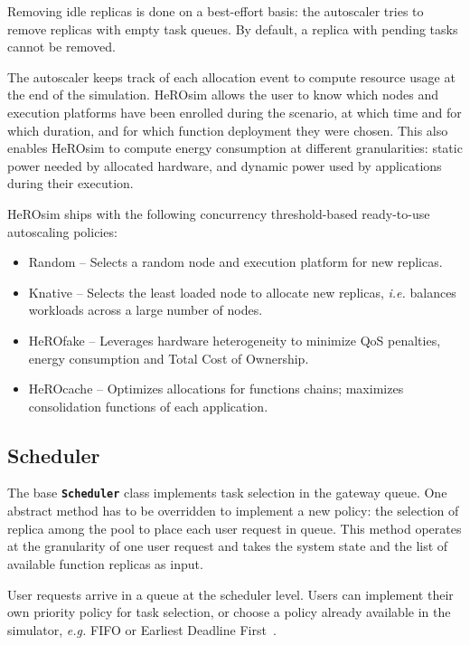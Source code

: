 Removing idle replicas is done on a best-effort basis: the autoscaler tries to remove replicas with empty task queues. By default, a replica with pending tasks cannot be removed.

The autoscaler keeps track of each allocation event to compute resource usage at the end of the simulation. HeROsim allows the user to know which nodes and execution platforms have been enrolled during the scenario, at which time and for which duration, and for which function deployment they were chosen. This also enables HeROsim to compute energy consumption at different granularities: static power needed by allocated hardware, and dynamic power used by applications during their execution.

HeROsim ships with the following concurrency threshold-based ready-to-use autoscaling policies:

\begin{itemize}
    \item Random -- Selects a random node and execution platform for new replicas.
    \item Knative -- Selects the least loaded node to allocate new replicas, \textit{i.e.} balances workloads across a large number of nodes.
    \item HeROfake -- Leverages hardware heterogeneity to minimize QoS penalties, energy consumption and Total Cost of Ownership. %
    \item HeROcache -- Optimizes allocations for functions chains; maximizes consolidation functions of each application. %
\end{itemize}

\subsection{Scheduler}

The base \textbf{\texttt{Scheduler}} class implements task selection in the gateway queue. One abstract method has to be overridden to implement a new policy: the selection of replica among the pool to place each user request in queue. This method operates at the granularity of one user request and takes the system state and the list of available function replicas as input.

User requests arrive in a queue at the scheduler level. Users can implement their own priority policy for task selection, or choose a policy already available in the simulator, \textit{e.g.} FIFO or Earliest Deadline First~\cite{herofake}.

